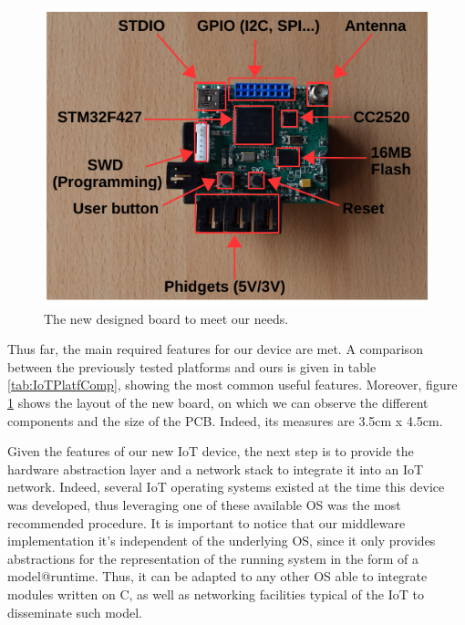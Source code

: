 \begin{figure}[htb]
	\centering
	\includegraphics[width=0.7\columnwidth]{chapters/intra-node.images/newBoard.pdf}
	\caption{The new designed board to meet our needs.} \label{fig:newBoard}
\end{figure}

Thus far, the main required features for our device are met.
A comparison between the previously tested platforms and ours is given in table \ref{tab:IoTPlatfComp}, showing the most common useful features.
Moreover, figure \ref{fig:newBoard} shows the layout of the new board, on which we can observe the different components and the size of the PCB.
Indeed, its measures are 3.5cm x 4.5cm.

Given the features of our new IoT device, the next step is to provide the hardware abstraction layer and a network stack to integrate it into an IoT network.
Indeed, several IoT operating systems existed at the time this device was developed, thus leveraging one of these available OS was the most recommended procedure.
It is important to notice that our middleware implementation it's independent of the underlying OS, since it only provides abstractions for the representation of the running system in the form of a model@runtime.
Thus, it can be adapted to any other OS able to integrate modules written on C, as well as networking facilities typical of the IoT to disseminate such model.


